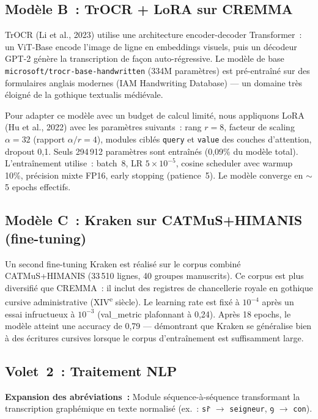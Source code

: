 \documentclass[11pt,a4paper]{article}
\begin{document}
\subsection{Modèle B~: TrOCR + LoRA sur CREMMA}

TrOCR (Li et al., 2023) utilise une architecture encoder-decoder Transformer~: un ViT-Base encode l'image de ligne en embeddings visuels, puis un décodeur GPT-2 génère la transcription de façon auto-régressive. Le modèle de base \texttt{microsoft/trocr-base-handwritten} (334M paramètres) est pré-entraîné sur des formulaires anglais modernes (IAM Handwriting Database) --- un domaine très éloigné de la gothique textualis médiévale.

Pour adapter ce modèle avec un budget de calcul limité, nous appliquons LoRA (Hu et al., 2022) avec les paramètres suivants~: rang $r=8$, facteur de scaling $\alpha=32$ (rapport $\alpha/r = 4$), modules ciblés \texttt{query} et \texttt{value} des couches d'attention, dropout 0,1. Seuls 294\,912 paramètres sont entraînés (0,09\% du modèle total). L'entraînement utilise~: batch~8, LR $5\times10^{-5}$, cosine scheduler avec warmup 10\%, précision mixte FP16, early stopping (patience~5). Le modèle converge en $\sim$5 epochs effectifs.

\subsection{Modèle C~: Kraken sur CATMuS+HIMANIS (fine-tuning)}

Un second fine-tuning Kraken est réalisé sur le corpus combiné CATMuS+HIMANIS (33\,510 lignes, 40 groupes manuscrits). Ce corpus est plus diversifié que CREMMA~: il inclut des registres de chancellerie royale en gothique cursive administrative (XIV\textsuperscript{e} siècle). Le learning rate est fixé à $10^{-4}$ après un essai infructueux à $10^{-3}$ (val\_metric plafonnant à 0,24). Après 18 epochs, le modèle atteint une accuracy de 0,79 --- démontrant que Kraken se généralise bien à des écritures cursives lorsque le corpus d'entraînement est suffisamment large.

\subsection{Volet~2~: Traitement NLP}

\textbf{Expansion des abréviations~:} Module séquence-à-séquence transformant la transcription graphémique en texte normalisé (ex.~: \texttt{sr̄} $\rightarrow$ \texttt{seigneur}, \texttt{ꝯ} $\rightarrow$ \texttt{con}).
\end{document}
